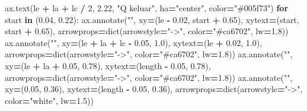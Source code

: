 \documentclass[
  12pt,a4paper,oneside]{report}
\newenvironment{Shaded}{\begin{snugshade}}{\end{snugshade}}
\newcommand{\BuiltInTok}[1]{#1}
\newcommand{\ControlFlowTok}[1]{\textcolor[rgb]{0.13,0.29,0.53}{\textbf{#1}}}
\newcommand{\DecValTok}[1]{\textcolor[rgb]{0.00,0.00,0.81}{#1}}
\newcommand{\FloatTok}[1]{\textcolor[rgb]{0.00,0.00,0.81}{#1}}
\newcommand{\KeywordTok}[1]{\textcolor[rgb]{0.13,0.29,0.53}{\textbf{#1}}}
\newcommand{\NormalTok}[1]{#1}
\newcommand{\OperatorTok}[1]{\textcolor[rgb]{0.81,0.36,0.00}{\textbf{#1}}}
\newcommand{\StringTok}[1]{\textcolor[rgb]{0.31,0.60,0.02}{#1}}
\begin{document}
\begin{Shaded}
\begin{Highlighting}[]
\NormalTok{    ax.text(le }\OperatorTok{+}\NormalTok{ la }\OperatorTok{+}\NormalTok{ lc }\OperatorTok{/} \DecValTok{2}\NormalTok{, }\FloatTok{2.22}\NormalTok{, }\StringTok{"Q keluar"}\NormalTok{, ha}\OperatorTok{=}\StringTok{"center"}\NormalTok{, color}\OperatorTok{=}\StringTok{"\#005f73"}\NormalTok{)}
    \ControlFlowTok{for}\NormalTok{ start }\KeywordTok{in}\NormalTok{ (}\FloatTok{0.04}\NormalTok{, }\FloatTok{0.22}\NormalTok{):}
\NormalTok{        ax.annotate(}\StringTok{""}\NormalTok{, xy}\OperatorTok{=}\NormalTok{(le }\OperatorTok{{-}} \FloatTok{0.02}\NormalTok{, start }\OperatorTok{+} \FloatTok{0.65}\NormalTok{), xytext}\OperatorTok{=}\NormalTok{(start, start }\OperatorTok{+} \FloatTok{0.65}\NormalTok{),}
\NormalTok{                    arrowprops}\OperatorTok{=}\BuiltInTok{dict}\NormalTok{(arrowstyle}\OperatorTok{=}\StringTok{"{-}\textgreater{}"}\NormalTok{, color}\OperatorTok{=}\StringTok{"\#ca6702"}\NormalTok{, lw}\OperatorTok{=}\FloatTok{1.8}\NormalTok{))}
\NormalTok{    ax.annotate(}\StringTok{""}\NormalTok{, xy}\OperatorTok{=}\NormalTok{(le }\OperatorTok{+}\NormalTok{ la }\OperatorTok{+}\NormalTok{ lc }\OperatorTok{{-}} \FloatTok{0.05}\NormalTok{, }\FloatTok{1.0}\NormalTok{), xytext}\OperatorTok{=}\NormalTok{(le }\OperatorTok{+} \FloatTok{0.02}\NormalTok{, }\FloatTok{1.0}\NormalTok{),}
\NormalTok{                arrowprops}\OperatorTok{=}\BuiltInTok{dict}\NormalTok{(arrowstyle}\OperatorTok{=}\StringTok{"{-}\textgreater{}"}\NormalTok{, color}\OperatorTok{=}\StringTok{"\#ca6702"}\NormalTok{, lw}\OperatorTok{=}\FloatTok{1.8}\NormalTok{))}
\NormalTok{    ax.annotate(}\StringTok{""}\NormalTok{, xy}\OperatorTok{=}\NormalTok{(le }\OperatorTok{+}\NormalTok{ la }\OperatorTok{+} \FloatTok{0.05}\NormalTok{, }\FloatTok{0.78}\NormalTok{), xytext}\OperatorTok{=}\NormalTok{(length }\OperatorTok{{-}} \FloatTok{0.05}\NormalTok{, }\FloatTok{0.78}\NormalTok{),}
\NormalTok{                arrowprops}\OperatorTok{=}\BuiltInTok{dict}\NormalTok{(arrowstyle}\OperatorTok{=}\StringTok{"{-}\textgreater{}"}\NormalTok{, color}\OperatorTok{=}\StringTok{"\#ca6702"}\NormalTok{, lw}\OperatorTok{=}\FloatTok{1.8}\NormalTok{))}
\NormalTok{    ax.annotate(}\StringTok{""}\NormalTok{, xy}\OperatorTok{=}\NormalTok{(}\FloatTok{0.05}\NormalTok{, }\FloatTok{0.36}\NormalTok{), xytext}\OperatorTok{=}\NormalTok{(length }\OperatorTok{{-}} \FloatTok{0.05}\NormalTok{, }\FloatTok{0.36}\NormalTok{),}
\NormalTok{                arrowprops}\OperatorTok{=}\BuiltInTok{dict}\NormalTok{(arrowstyle}\OperatorTok{=}\StringTok{"{-}\textgreater{}"}\NormalTok{, color}\OperatorTok{=}\StringTok{"white"}\NormalTok{, lw}\OperatorTok{=}\FloatTok{1.5}\NormalTok{))}

\end{Highlighting}
\end{Shaded}
\end{document}
